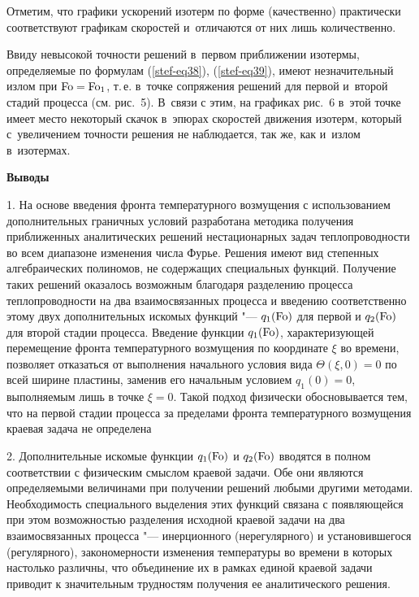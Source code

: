 Отметим, что графики ускорений изотерм по форме (качественно) практически 
соответствуют графикам скоростей и~отличаются от них лишь количественно.

Ввиду невысокой точности решений в~первом приближении изотермы, определяемые 
по формулам (\ref{stef-eq38}), (\ref{stef-eq39}), имеют незначительный излом 
при ${\rm Fo}={\rm Fo}_1 $, т.\,е. в~точке сопряжения решений для первой и~второй стадий 
процесса (см. рис.~5). В~связи с этим, на графиках рис.~6 в~этой точке имеет место некоторый скачок 
в~эпюрах скоростей движения изотерм, который с~увеличением точности решения не 
наблюдается, так же, как и~излом в~изотермах.


{\centering 

\bigskip

\textbf{Выводы}

}


1. На основе введения фронта температурного возмущения с использованием 
дополнительных граничных условий разработана методика получения приближенных 
аналитических решений нестационарных задач теплопроводности во всем 
диапазоне изменения числа Фурье. Решения имеют вид степенных алгебраических 
полиномов, не содержащих специальных функций. Получение таких решений 
оказалось возможным благодаря разделению процесса теплопроводности на два 
взаимосвязанных процесса и введению соответственно этому двух дополнительных 
искомых функций "--- $q_1 ({\rm Fo})$ для первой и $q_2 
({\rm Fo})$ для второй стадии процесса. Введение функции $q_1 
({\rm Fo})$, характеризующей перемещение фронта температурного 
возмущения по координате $\xi $ во времени, позволяет отказаться от 
выполнения начального условия вида $ \Theta (\xi, 0)=0$ по всей ширине пластины, заменив его начальным условием 
$q_1 (0)=0$, выполняемым лишь в точке $\xi =0$. 
Такой подход физически обосновывается тем, что на первой стадии процесса за 
пределами фронта температурного возмущения краевая задача не определена 

2. Дополнительные искомые функции $q_1 ({\rm Fo})$ и 
$q_2 ({\rm Fo})$ вводятся в полном соответствии с физическим 
смыслом краевой задачи. Обе они являются определяемыми величинами при 
получении решений любыми другими методами. Необходимость специального 
выделения этих функций связана с появляющейся при этом возможностью 
разделения исходной краевой задачи на два взаимосвязанных процесса "--- 
инерционного (нерегулярного) и установившегося (регулярного), закономерности 
изменения температуры во времени в которых настолько различны, что 
объединение их в рамках единой краевой задачи приводит к значительным 
трудностям получения ее аналитического решения. 


